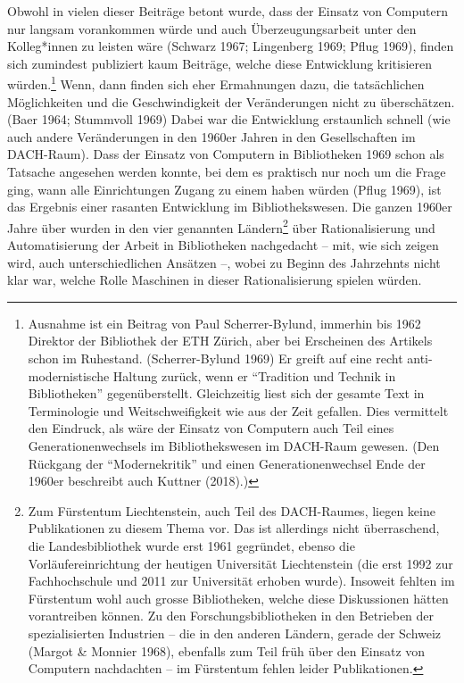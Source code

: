 \documentclass[a4paper,
fontsize=11pt,
oneside,
numbers=noperiodatend,
parskip=half-,
bibliography=totoc,
final
]{scrartcl}
\begin{document}
Obwohl in vielen dieser Beiträge betont wurde, dass der Einsatz von
Computern nur langsam vorankommen würde und auch Überzeugungsarbeit
unter den Kolleg*innen zu leisten wäre (Schwarz 1967; Lingenberg 1969;
Pflug 1969), finden sich zumindest publiziert kaum Beiträge, welche
diese Entwicklung kritisieren würden.\footnote{Ausnahme ist ein Beitrag
  von Paul Scherrer-Bylund, immerhin bis 1962 Direktor der Bibliothek
  der ETH Zürich, aber bei Erscheinen des Artikels schon im Ruhestand.
  (Scherrer-Bylund 1969) Er greift auf eine recht anti-modernistische
  Haltung zurück, wenn er \enquote{Tradition und Technik in Bibliotheken}
  gegenüberstellt. Gleichzeitig liest sich der gesamte Text in
  Terminologie und Weitschweifigkeit wie aus der Zeit gefallen. Dies
  vermittelt den Eindruck, als wäre der Einsatz von Computern auch Teil
  eines Generationenwechsels im Bibliothekswesen im DACH-Raum gewesen.
  (Den Rückgang der \enquote{Modernekritik} und einen Generationenwechsel Ende
  der 1960er beschreibt auch Kuttner (2018).)} Wenn, dann finden sich
eher Ermahnungen dazu, die tatsächlichen Möglichkeiten und die
Geschwindigkeit der Veränderungen nicht zu überschätzen. (Baer 1964;
Stummvoll 1969) Dabei war die Entwicklung erstaunlich schnell (wie auch
andere Veränderungen in den 1960er Jahren in den Gesellschaften im
DACH-Raum). Dass der Einsatz von Computern in Bibliotheken 1969 schon
als Tatsache angesehen werden konnte, bei dem es praktisch nur noch um
die Frage ging, wann alle Einrichtungen Zugang zu einem haben würden
(Pflug 1969), ist das Ergebnis einer rasanten Entwicklung im
Bibliothekswesen. Die ganzen 1960er Jahre über wurden in den vier
genannten Ländern\footnote{Zum Fürstentum Liechtenstein, auch Teil des
  DACH-Raumes, liegen keine Publikationen zu diesem Thema vor. Das ist
  allerdings nicht überraschend, die Landesbibliothek wurde erst 1961
  gegründet, ebenso die Vorläufereinrichtung der heutigen Universität
  Liechtenstein (die erst 1992 zur Fachhochschule und 2011 zur
  Universität erhoben wurde). Insoweit fehlten im Fürstentum wohl auch
  grosse Bibliotheken, welche diese Diskussionen hätten vorantreiben
  können. Zu den Forschungsbibliotheken in den Betrieben der
  spezialisierten Industrien -- die in den anderen Ländern, gerade der
  Schweiz (Margot \& Monnier 1968), ebenfalls zum Teil früh über den
  Einsatz von Computern nachdachten -- im Fürstentum fehlen leider
  Publikationen.} über Rationalisierung und Automatisierung der Arbeit
in Bibliotheken nachgedacht -- mit, wie sich zeigen wird, auch
unterschiedlichen Ansätzen --, wobei zu Beginn des Jahrzehnts nicht klar
war, welche Rolle Maschinen in dieser Rationalisierung spielen würden.
\end{document}

